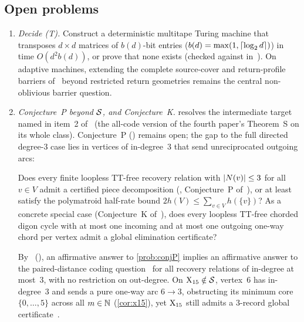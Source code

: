 \subsection{Open problems}

\begin{enumerate}[label=\arabic*.,leftmargin=2em]
\item \emph{Decide (T).} Construct a deterministic multitape Turing machine that transposes $d \times d$ matrices of
  $b(d)$-bit entries ($b(d) = \max(1, \lceil \log_2 d \rceil)$) in time $O(d^2 b(d))$, or prove that none exists (checked against
   in~\cite{FirstPaper2026}). On adaptive machines, extending the complete
  source-cover and return-profile barriers of~\cite{NinthPaper2026} beyond restricted return geometries remains the central
  non-oblivious barrier question.

\item \emph{Conjecture~P beyond $\mathcal{S}$, and Conjecture~K.}  resolves the intermediate target named in
  item~2 of~\cite[Section~9.2]{SeventhPaper2026} (the all-code version of the fourth paper's Theorem~S on its whole class).
  Conjecture~P (\cite[Conjecture~9.1]{SeventhPaper2026}) remains open; the gap to the full directed degree-$3$ case lies
  in vertices of in-degree~$3$ that send unreciprocated outgoing arcs:
  \begin{problem}\label{prob:conjP}
  Does every finite loopless TT-free recovery relation with $\lvert N(v) \rvert \le 3$ for all $v \in V$ admit a certified piece
  decomposition (, Conjecture~P of~\cite[Section~9.2]{SeventhPaper2026}), or at least satisfy the
  polymatroid half-rate bound $2 h(V) \le \sum_{v \in V} h(\{v\})$? As a concrete special case (Conjecture~K
  of~\cite[Section~9.2]{SeventhPaper2026}), does every loopless TT-free chorded digon cycle with at most one incoming and at
  most one outgoing one-way chord per vertex admit a global elimination certificate?
  \end{problem}
  By~\cite[Proposition~8.1]{SeventhPaper2026} (), an affirmative answer to
  \cref{prob:conjP} implies an affirmative answer to the paired-distance coding question~\cite[Question~9.1]{DirectedRecovery2026}
  for all recovery relations of in-degree at most~$3$, with no restriction on out-degree. On $\mathrm{X}_{15} \notin \mathcal{S}$, vertex~$6$
  has in-degree~$3$ and sends a pure one-way arc $6 \to 3$, obstructing its minimum core $\{0,\dots,5\}$ across all $m \in \mathbb{N}$
  (\cref{cor:x15}), yet $\mathrm{X}_{15}$ still admits a $3$-record global certificate~\cite[Remark~7.3]{SeventhPaper2026}.


\end{enumerate}

